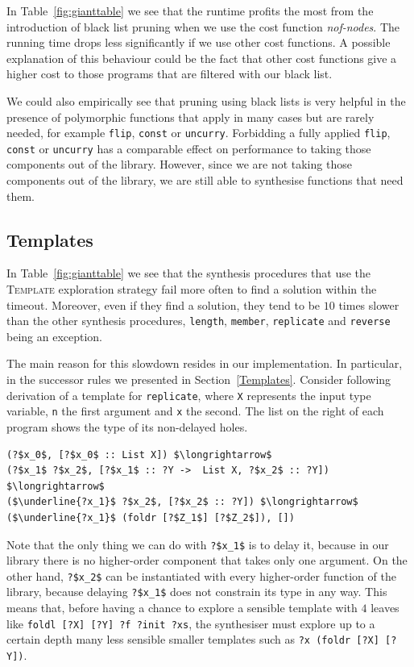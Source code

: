 In Table~\ref{fig:gianttable} we see that the runtime profits the most from the introduction of black list pruning when we use the cost function \textit{nof-nodes}.
The running time drops less significantly if we use other cost functions. A possible explanation of this behaviour could be the fact that other cost functions give a higher cost to those programs that are filtered with our black list.

We could also empirically see that pruning using black lists is very helpful in the presence of polymorphic functions that apply in many cases but are rarely needed, for example \lstinline?flip?, \lstinline?const? or \lstinline?uncurry?. Forbidding a fully applied \lstinline?flip?, \lstinline?const? or \lstinline?uncurry? has a comparable effect on performance to taking those components out of the library. However, since we are not taking those components out of the library, we are still able to synthesise functions that need them.

\subsection{Templates}\label{Eval. Templates}
In Table~\ref{fig:gianttable} we see that the synthesis procedures that use the \textsc{Template} exploration strategy fail more often to find a solution within the timeout. Moreover, even if they find a solution, they tend to be $10$ times slower than the other synthesis procedures, \lstinline?length?, \lstinline?member?, \lstinline?replicate? and \lstinline?reverse? being an exception.

The main reason for this slowdown resides in our implementation. In particular, in the successor rules we presented in Section~\ref{Templates}. 
Consider following derivation of a template for \lstinline?replicate?, where \lstinline?X? represents the input type variable, \lstinline?n? the first argument and \lstinline?x? the second. The list on the right of each program shows the type of its non-delayed holes.
\begin{lstlisting}[style=plain]
(?$x_0$, [?$x_0$ :: List X]) $\longrightarrow$
(?$x_1$ ?$x_2$, [?$x_1$ :: ?Y ->  List X, ?$x_2$ :: ?Y]) $\longrightarrow$
($\underline{?x_1}$ ?$x_2$, [?$x_2$ :: ?Y]) $\longrightarrow$
($\underline{?x_1}$ (foldr [?$Z_1$] [?$Z_2$]), [])
\end{lstlisting}
Note that the only thing we can do with \lstinline!?$x_1$! is to delay it, because in our library there is no higher-order component that takes only one argument. On the other hand, \lstinline!?$x_2$! can be instantiated with every higher-order function of the library, because delaying \lstinline!?$x_1$! does not constrain its type in any way.
This means that, before having a chance to explore a sensible template with $4$ leaves like \lstinline!foldl [?X] [?Y] ?f ?init ?xs!, the synthesiser must explore up to a certain depth many less sensible smaller templates such as \lstinline!?x (foldr [?X] [?Y])!.

